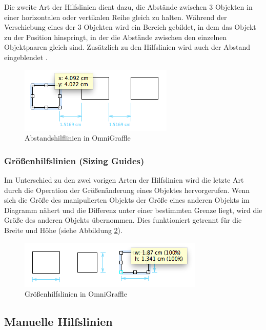 Die zweite Art der Hilfslinien dient dazu, die Abstände zwischen 3 Objekten in einer horizontalen oder vertikalen Reihe gleich zu halten. Während der Verschiebung eines der 3 Objekten wird ein Bereich gebildet, in dem das Objekt zu der Position hinspringt, in der die Abstände zwischen den einzelnen Objektpaaren gleich sind. Zusätzlich zu den Hilfslinien wird auch der Abstand eingeblendet \cite{11Keynote, Olsen10OmniGraffle}.

\begin{figure}[hbt]
    \centering
    \includegraphics{resources/omnigraffle-distance-guides.png}
    \caption{Abstandshilflinien in OmniGraffle}
    \label{fig:omnigraffle-distance-guides}
\end{figure}

\subsubsection{Größenhilfslinien (Sizing Guides)}

Im Unterschied zu den zwei vorigen Arten der Hilfslinien wird die letzte Art durch die Operation der Größenänderung eines Objektes hervorgerufen. Wenn sich die Größe des manipulierten Objekts der Größe eines anderen Objekts im Diagramm nähert und die Differenz unter einer bestimmten Grenze liegt, wird die Größe des anderen Objekts übernommen. Dies funktioniert getrennt für die Breite und Höhe (siehe Abbildung \ref{fig:omnigraffle-sizing-guides}).

\begin{figure}[hbt]
    \centering
    \includegraphics{resources/omnigraffle-sizing-guides.png}
    \caption{Größenhilfslinien in OmniGraffle}
    \label{fig:omnigraffle-sizing-guides}
\end{figure}

\subsection{Manuelle Hilfslinien}

